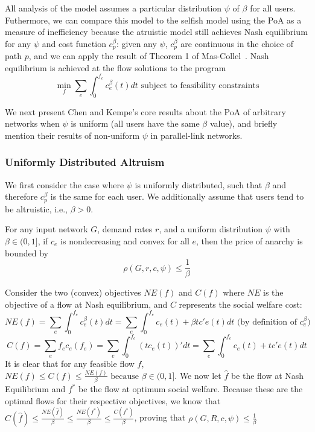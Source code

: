 All analysis of the model assumes a particular distribution $\psi$ of $\beta$ for all users. 
Futhermore, we can compare this model to the selfish model using the PoA as a measure of inefficiency
because the atruistic model still achieves Nash equilibrium for any $\psi$ and cost function $c^\beta_p$: given any $\psi$, $c^\beta_p$ are continuous in the choice of path $p$, and we can apply the result of Theorem 1 of Mas-Collel~\cite{mascollel}. Nash equilibrium is achieved at the flow solutions to the program
$$\min_f\sum_e\int_0^{f_e}c_e^\beta(t)dt \text{ subject to feasibility constraints}$$

We next present Chen and Kempe's core results about the PoA of arbitrary networks when $\psi$ is uniform (all users have the same $\beta$ value), and briefly mention their results of non-uniform $\psi$ in parallel-link networks.

\subsubsection{Uniformly Distributed Altruism}
We first consider the case where $\psi$ is uniformly distributed, such that $\beta$ and therefore $c^\beta_p$ is the same for each user. We additionally assume that users tend to be altruistic, i.e., $\beta > 0$.
\begin{theorem}
For any input network $G$, demand rates $r$, and 
a uniform distribution $\psi$ with $\beta \in (0, 1]$,
if $c_e$ is nondecreasing and convex for all $e$,
    then the price of anarchy is bounded by 
    $$\rho(G,r,c,\psi) \le \frac{1}{\beta}$$
\end{theorem}

\begin{proof-sketch}
    Consider the two (convex) objectives $NE(f)$ and $C(f)$ where $NE$ is the objective of a flow at Nash equilibrium, and $C$ represents the social welfare cost:
    $$NE({f}) = \sum_e\int_0^{{f}_e}c_e^\beta(t)dt = 
        \sum_e\int_0^{{f}_e} c_e(t) + \beta tc'e(t)dt\text{ (by definition of $c^\beta_e$)}$$
    $$C(f) = \sum_ef_ec_e(f_e) = \sum_e\int_0^{f_e} (tc_e(t))' dt 
        = \sum_e\int_0^{f_e} c_e(t) + tc'e(t)dt$$ 
    It is clear that for any feasible flow $f$, 
    $NE(f) \le C(f) \le \frac{NE(f)}{\beta} \text{ because $\beta\in(0,1]$}$.
    We now let $\hat{f}$ be the flow at Nash Equilibrium and $f^*$ be the flow at optimum social welfare. Because these are the optimal flows for their respective objectives, we know that 
    $C(\hat{f}) \le \frac{NE(\hat{f})}{\beta} \le \frac{NE(f^*)}{\beta} \le \frac{C(f^*)}{\beta}$,
    proving that 
    $\rho(G,R,c,\psi) \le \frac{1}{\beta}$
\end{proof-sketch}

